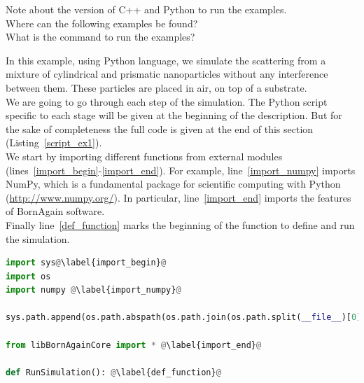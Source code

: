 \noindent Note about the version of C++ and Python to run the
examples.\\

\noindent Where can the following examples be found?\\


\noindent What is the command to run the examples?


In this example, using Python language, we simulate the scattering from a mixture of
cylindrical and prismatic nanoparticles without any interference
between them. These particles are placed in air, on top
of a substrate.\\ We are going to go through each step of the
simulation. The Python script specific to each stage will be given at
the beginning of the description. But for the sake of completeness the full code is given
at the end of this section (Listing~\ref{script_ex1}). \\

\noindent We start by importing different functions from external
modules (lines~\ref{import_begin}-\ref{import_end}). For example,
line~\ref{import_numpy}  imports NumPy, which
is a fundamental package for scientific computing with Python
(\url{http://www.numpy.org/}).  In particular, line~\ref{import_end}
imports the features of BornAgain software.\\

\noindent Finally line~\ref{def_function} marks the beginning of the
function to define and run the simulation. 

\begin{lstlisting}[language=python, style=eclipseboxed,name=ex1,nolol]
import sys@\label{import_begin}@
import os
import numpy @\label{import_numpy}@

sys.path.append(os.path.abspath(os.path.join(os.path.split(__file__)[0],'..', '..', '..', 'lib')))

from libBornAgainCore import * @\label{import_end}@

def RunSimulation(): @\label{def_function}@
\end{lstlisting}


